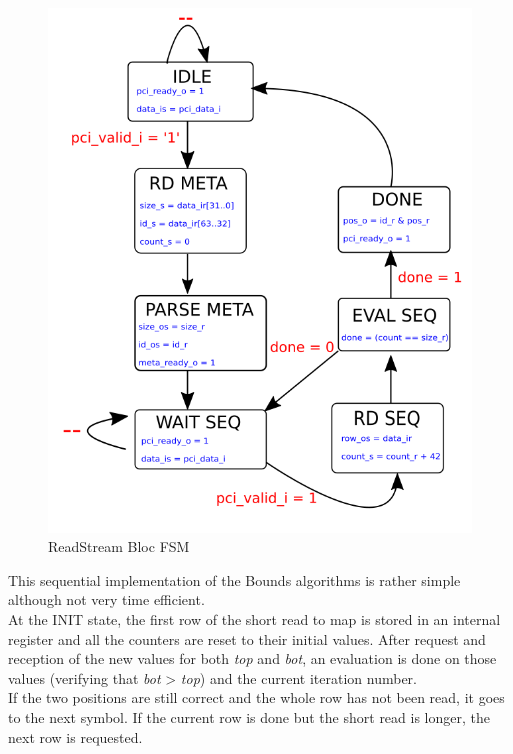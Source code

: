 \begin{minipage}[t]{0.45\textwidth}
\begin{figure}[H]
    \centering
    \hspace*{-20mm}\includegraphics[scale = 0.4]{Figures/RDPCI_FSM.png}
    \caption{ReadStream Bloc FSM}
    \label{fig:bounds_fsm}
\end{figure}
\end{minipage}
\hfill
\begin{minipage}[t]{0.4\textwidth}
This sequential implementation of the Bounds algorithms is rather simple although not very time efficient. \\

At the INIT state, the first row of the short read to map is stored in an internal register and all the counters are reset to their initial values. After request and reception of the new values for both \textit{top} and \textit{bot}, an evaluation is done on those values (verifying that \textit{bot} > \textit{top}) and the current iteration number. \\
If the two positions are still correct and the whole row has not been read, it goes to the next symbol. If the current row is done but the short read is longer, the next row is requested.
\end{minipage}

